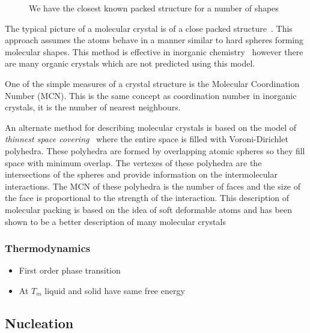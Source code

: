 \begin{figure}
    \caption{We have the closest known packed structure for a number of shapes}
    \label{fig:hcp}
\end{figure}


The typical picture of a molecular crystal is of a close packed structure~\cite{kitaigorodskii:73}. This approach assumes the atoms behave in a manner similar to hard spheres forming molecular shapes. This method is effective in inorganic chemistry~\cite{wells:84} however there are many organic crystals which are not predicted using this model.

One of the simple measures of a crystal structure is the Molecular Coordination Number (MCN). This is the same concept as coordination number in inorganic crystals, it is the number of nearest neighbours.

An alternate method for describing molecular crystals is based on the model of \emph{thinnest space covering}~\cite{blatov:95} where the entire space is filled with Voroni-Dirichlet polyhedra. These polyhedra are formed by overlapping atomic spheres so they fill space with minimum overlap. The vertexes of these polyhedra are the intersections of the spheres and provide information on the intermolecular interactions. The MCN of these polyhedra is the number of faces and the size of the face is proportional to the strength of the interaction. This description of molecular packing is based on the idea of soft deformable atoms and has been shown to be a better description of many molecular crystals~\cite{blatov:97,peresypkina:99,peresypkina:00}

\subsubsection{Thermodynamics}
\begin{itemize}

    \item First order phase transition
    \item At $T_m$ liquid and solid have same free energy
\end{itemize}

\subsection{Nucleation}

